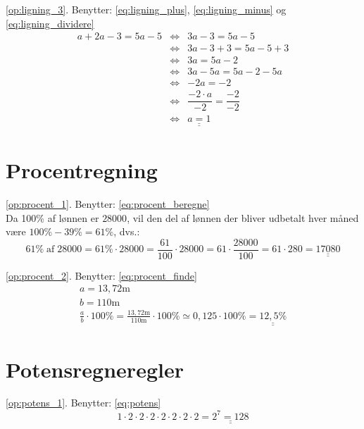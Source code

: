 \documentclass[11pt,a5paper,fleqn,leqno]{book}
\begin{document}
\ref{op:ligning_3}. Benytter: \eqref{eq:ligning_plus}, \eqref{eq:ligning_minus} og \eqref{eq:ligning_dividere}
\begin{displaymath}\begin{array}{rcl}
a+2a-3 = 5a -5 & \Leftrightarrow & 3a-3 = 5a-5 \\
               & \Leftrightarrow & 3a-3+3 = 5a-5+3 \\
               & \Leftrightarrow & 3a = 5a-2 \\
               & \Leftrightarrow & 3a - 5a = 5a-2-5a \\
               & \Leftrightarrow & -2a = -2 \\
               & \Leftrightarrow & \dfrac{-2 \cdot a}{-2} = \dfrac{-2}{-2} \\
               & \Leftrightarrow & \underline{\underline{a = 1}}
\end{array}\end{displaymath}

\section{Procentregning}

\ref{op:procent_1}. Benytter: \eqref{eq:procent_beregne} \\
Da 100\% af lønnen er $28000$, vil den del af lønnen der bliver udbetalt hver måned være $100\% - 39\% = 61\%$, dvs.:
\[61\% \; \text{af} \; 28000 = 61\% \cdot 28000 = \frac{61}{100} \cdot 28000 = 61 \cdot \frac{28000}{100} = 61 \cdot 280 = \underline{\underline{17080}}\]

\ref{op:procent_2}. Benytter: \eqref{eq:procent_finde} \\
\begin{displaymath}\begin{array}{l}
a = 13,72 \text{m} \\
b = 110 \text{m} \\
\frac{a}{b} \cdot 100\% = \frac{13,72 \text{m}}{110 \text{m}} \cdot 100\% \simeq 0,125 \cdot 100\% = \underline{\underline{12,5\%}}
\end{array}\end{displaymath}

\section{Potensregneregler}

\ref{op:potens_1}. Benytter: \eqref{eq:potens}
\[1 \cdot 2 \cdot 2 \cdot 2 \cdot 2 \cdot 2 \cdot 2 \cdot 2 = \underline{\underline{2^7 = 128}}\]
\end{document}
